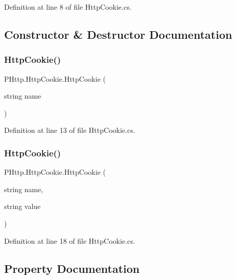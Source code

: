 Definition at line 8 of file Http\+Cookie.\+cs.



\subsection{Constructor \& Destructor Documentation}
\mbox{\label{class_p_http_1_1_http_cookie_a7053d0b069f9e817142f94e211dcf01d}} 
\subsubsection{\texorpdfstring{Http\+Cookie()}{HttpCookie()}\hspace{0.1cm}{\footnotesize\ttfamily [1/2]}}
{\footnotesize\ttfamily P\+Http.\+Http\+Cookie.\+Http\+Cookie (\begin{DoxyParamCaption}\item[{string}]{name }\end{DoxyParamCaption})}



Definition at line 13 of file Http\+Cookie.\+cs.

\mbox{\label{class_p_http_1_1_http_cookie_a685952d54bc37dca1979ef1932875fc4}} 
\subsubsection{\texorpdfstring{Http\+Cookie()}{HttpCookie()}\hspace{0.1cm}{\footnotesize\ttfamily [2/2]}}
{\footnotesize\ttfamily P\+Http.\+Http\+Cookie.\+Http\+Cookie (\begin{DoxyParamCaption}\item[{string}]{name,  }\item[{string}]{value }\end{DoxyParamCaption})}



Definition at line 18 of file Http\+Cookie.\+cs.



\subsection{Property Documentation}
\mbox{\label{class_p_http_1_1_http_cookie_a8565baef8b0d7b2de58a8a3e6d702a7a}} 
